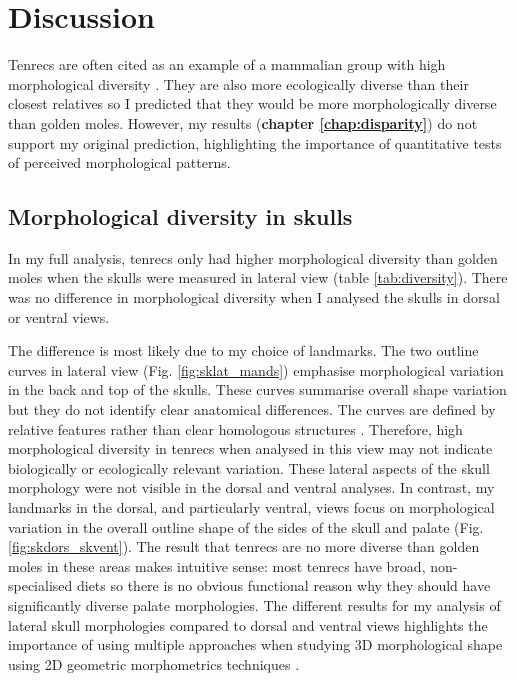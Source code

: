 \chapter{Discussion}
\label{chap:discussion}

\noindent

Tenrecs are often cited as an example of a mammalian group with high morphological diversity \citep{Olson2013, Soarimalala2011, Eisenberg1969}. They are also more ecologically diverse than their closest relatives \citep{Soarimalala2011, Bronner1995} so I predicted that they would be more morphologically diverse than golden moles. However, my results (\textbf{chapter \ref{chap:disparity}}) do not support my original prediction, highlighting the importance of quantitative tests of perceived morphological patterns.

\section{Morphological diversity in skulls}

	In my full analysis, tenrecs only had higher morphological diversity than golden moles when the skulls were measured in lateral view (table \ref{tab:diversity}). There was no difference in morphological diversity when I analysed the skulls in dorsal or ventral views.
	 
	The difference is most likely due to my choice of landmarks. The two outline curves in lateral view (Fig. \ref{fig:sklat_mands}) emphasise morphological variation in the back and top of the skulls. These curves summarise overall shape variation but they do not identify clear anatomical differences. The curves are defined by relative features rather than clear homologous structures \citep{Zelditch2012}. Therefore, high morphological diversity in tenrecs when analysed in this view may not indicate biologically or ecologically relevant variation.	
	These lateral aspects of the skull morphology were not visible in the dorsal and ventral analyses. In contrast, my landmarks in the dorsal, and particularly ventral, views focus on morphological variation in the overall outline shape of the sides of the skull and palate (Fig. \ref{fig:skdors_skvent}). 	The result that tenrecs are no more diverse than golden moles in these areas makes intuitive sense: most tenrecs have broad, non-specialised diets \citep{Olson2013} so there is no obvious functional reason why they should have significantly diverse palate morphologies.
	The different results for my analysis of lateral skull morphologies compared to dorsal and ventral views highlights the importance of using multiple approaches when studying 3D morphological shape using 2D geometric morphometrics techniques \citep{Arnqvist1998}.

